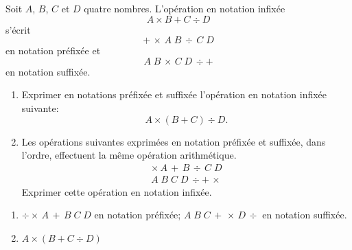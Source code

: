 \begin{exercice}
  Soit $A$, $B$, $C$ et $D$ quatre nombres. L'opération en notation
  infixée
  \begin{equation*}
    A \times B + C \div D
  \end{equation*}
  s'écrit
  \begin{equation*}
    +\, \times\, A\; B\, \div\, C\; D
  \end{equation*}
  en notation préfixée et
  \begin{equation*}
    A\; B\, \times\, C\; D\, \div +
  \end{equation*}
  en notation suffixée.
  \begin{enumerate}
  \item Exprimer en notations préfixée et suffixée l'opération en
    notation infixée suivante:
    \begin{equation*}
      A \times (B + C) \div D.
    \end{equation*}
  \item Les opérations suivantes exprimées en notation préfixée et
    suffixée, dans l'ordre, effectuent la même opération arithmétique.
    \begin{gather*}
      \times\, A\, +\, B\, \div\, C\; D \\
      A\; B\; C\; D\, \div +\, \times
    \end{gather*}
    Exprimer cette opération en notation infixée.
  \end{enumerate}
  \begin{sol}
    \begin{enumerate}
    \item $\div \times\, A\, +\, B\; C\; D$ en notation préfixée;
      $A\; B\; C\, +\, \times\, D\, \div$ en notation suffixée.
    \item $A \times (B + C \div D)$
    \end{enumerate}
  \end{sol}
\end{exercice}


